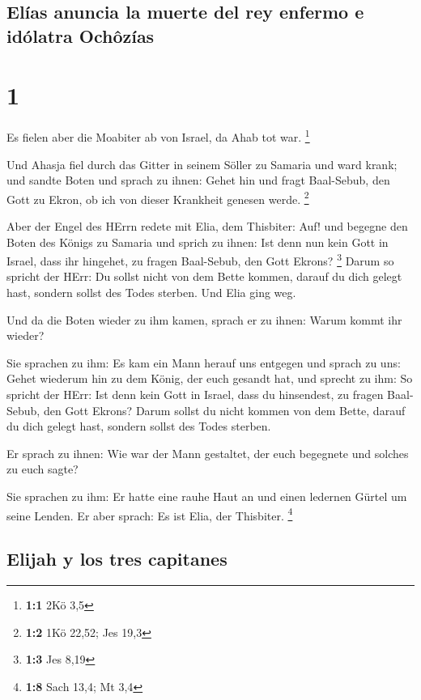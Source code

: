 \hypertarget{eluxedas-anuncia-la-muerte-del-rey-enfermo-e-iduxf3latra-ochuxf4zuxedas}{%
\subsection{Elías anuncia la muerte del rey enfermo e idólatra
Ochôzías}\label{eluxedas-anuncia-la-muerte-del-rey-enfermo-e-iduxf3latra-ochuxf4zuxedas}}

\hypertarget{section}{%
\section{1}\label{section}}

 Es fielen aber die Moabiter ab von Israel, da Ahab tot
war. \footnote{\textbf{1:1} 2Kö 3,5}

 Und Ahasja fiel durch das Gitter in seinem Söller zu
Samaria und ward krank; und sandte Boten und sprach zu ihnen: Gehet hin
und fragt Baal-Sebub, den Gott zu Ekron, ob ich von dieser Krankheit
genesen werde. \footnote{\textbf{1:2} 1Kö 22,52; Jes 19,3}

 Aber der Engel des HErrn redete mit Elia, dem Thisbiter:
Auf! und begegne den Boten des Königs zu Samaria und sprich zu ihnen:
Ist denn nun kein Gott in Israel, dass ihr hingehet, zu fragen
Baal-Sebub, den Gott Ekrons? \footnote{\textbf{1:3} Jes 8,19}
 Darum so spricht der HErr: Du sollst nicht von dem Bette
kommen, darauf du dich gelegt hast, sondern sollst des Todes sterben.
Und Elia ging weg.

 Und da die Boten wieder zu ihm kamen, sprach er zu ihnen:
Warum kommt ihr wieder?

 Sie sprachen zu ihm: Es kam ein Mann herauf uns entgegen
und sprach zu uns: Gehet wiederum hin zu dem König, der euch gesandt
hat, und sprecht zu ihm: So spricht der HErr: Ist denn kein Gott in
Israel, dass du hinsendest, zu fragen Baal-Sebub, den Gott Ekrons? Darum
sollst du nicht kommen von dem Bette, darauf du dich gelegt hast,
sondern sollst des Todes sterben.

 Er sprach zu ihnen: Wie war der Mann gestaltet, der euch
begegnete und solches zu euch sagte?

 Sie sprachen zu ihm: Er hatte eine rauhe Haut an und
einen ledernen Gürtel um seine Lenden. Er aber sprach: Es ist Elia, der
Thisbiter. \footnote{\textbf{1:8} Sach 13,4; Mt 3,4}

\hypertarget{elijah-y-los-tres-capitanes}{%
\subsection{Elijah y los tres
capitanes}\label{elijah-y-los-tres-capitanes}}

